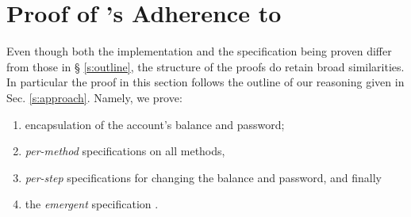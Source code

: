 \clearpage
\section{Proof of \ModD's Adherence to \SrobustB}
\label{app:examples}




 
Even though both the implementation and the specification being proven differ from those in \S
\ref{s:outline}, the structure of the proofs do retain broad similarities. In particular the proof in this section 
follows the outline of our reasoning given in Sec. \ref{s:approach}.
Namely, we prove:\\
\begin{enumerate}
\item
encapsulation of the account's balance and   password;
\item \emph{per-method} \Nec specifications on all \ModD methods,  
\item \emph{per-step} \Nec specifications for changing the balance and password, 
and finally 
\item the \emph{emergent} \Nec specification \SrobustB. 
\end{enumerate}

\noindent
{}


